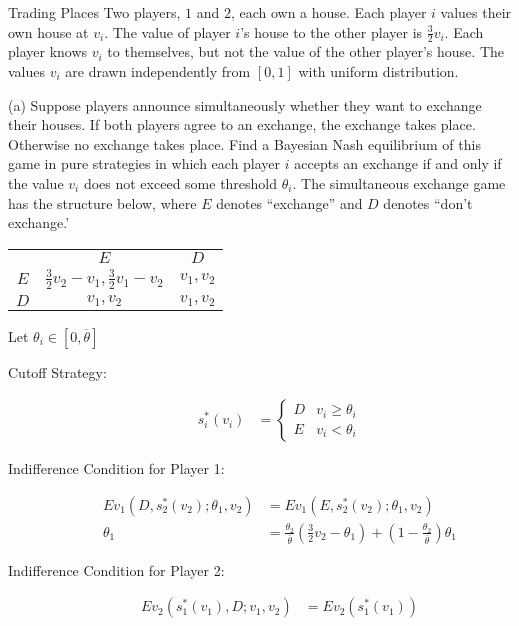 \documentclass[8pt]{extarticle}
\begin{document}
  \begin{problem}{Trading Places}
    Two players, $1$ and $2$, each own a house. Each player $i$ values their own house at $v_i$. The value of player $i$'s house to the other player is $\frac{3}{2}v_i$. Each player knows $v_i$ to themselves, but not the value of the other player's house. The values $v_i$ are drawn independently from $[0,1]$ with uniform distribution.
    \tcblower
    \begin{problem}{(a)}
      Suppose players announce simultaneously whether they want to exchange their houses. If both players agree to an exchange, the exchange takes place. Otherwise no exchange takes place. Find a Bayesian Nash equilibrium of this game in pure strategies in which each player $i$ accepts an exchange if and only if the value $v_i$ does not exceed some threshold $\theta_{i}$.
      \tcblower
      The simultaneous exchange game has the structure below, where $E$ denotes ``exchange'' and $D$ denotes ``don't exchange.'
      \begin{center}
        \renewcommand{\arraystretch}{1.65}
        \begin{tabular}{c|c|c|}
          \multicolumn{1}{c}{} & \multicolumn{1}{c}{$E$} & \multicolumn{1}{c}{$D$}\\
          \cline{2-3}
          $E$ & $\frac{3}{2}v_2 - v_1,\frac{3}{2}v_1 - v_2$ & $v_1,v_2$\\
          \cline{2-3}
          $D$ & $v_1,v_2$ & $v_1,v_2$\\
          \cline{2-3}
        \end{tabular}
      \end{center}
      Let $\theta_i \in [0,\overline{\theta}]$
      \begin{description}
        \item[Cutoff Strategy:]
          \begin{align*}
            s_{i}^{\ast}(v_i) &= \begin{cases}
              D & v_i \geq \theta_i\\
              E & v_i < \theta_i
            \end{cases}
          \end{align*}
        \item[Indifference Condition for Player 1:]
          \begin{align*}
            Ev_{1}(D,s_2^{\ast}(v_2);\theta_1,v_2) &= Ev_1(E,s_2^{\ast}(v_2);\theta_1,v_2)\\
            \theta_1 &= \frac{\theta_2}{\overline{\theta}}\left(\frac{3}{2}v_2 - \theta_1\right) + \left(1 - \frac{\theta_2}{\overline{\theta}}\right)\theta_1
          \end{align*}
        \item[Indifference Condition for Player 2:]
          \begin{align*}
            Ev_2(s_1^{\ast}(v_1),D;v_1,v_2) &= Ev_2(s_1^{\ast}(v_1))
          \end{align*}
      \end{description}
    \end{problem}
  \end{problem}
\end{document}

